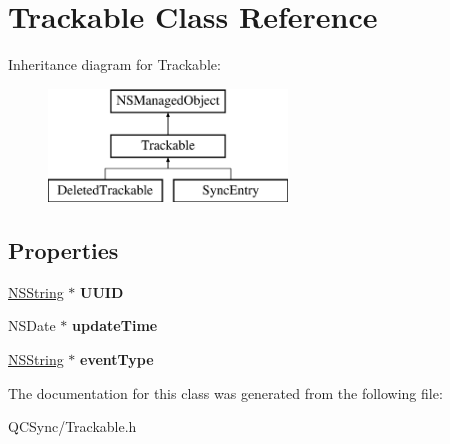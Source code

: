\hypertarget{interface_trackable}{
\section{Trackable Class Reference}
\label{interface_trackable}
}
Inheritance diagram for Trackable:\begin{figure}[H]
\begin{center}
\leavevmode
\includegraphics[height=3.000000cm]{interface_trackable}
\end{center}
\end{figure}
\subsection*{Properties}
\begin{DoxyCompactItemize}
\item 
\hypertarget{interface_trackable_a028842f8d9877c8b8011daf6a133a252}{
\hyperlink{class_n_s_string}{NSString} $\ast$ {\bfseries UUID}}
\label{interface_trackable_a028842f8d9877c8b8011daf6a133a252}

\item 
\hypertarget{interface_trackable_ae6e33e19d2af5964d713171153165bb2}{
NSDate $\ast$ {\bfseries updateTime}}
\label{interface_trackable_ae6e33e19d2af5964d713171153165bb2}

\item 
\hypertarget{interface_trackable_a8d6690b09a4e48b9bfd9e4adab7a8106}{
\hyperlink{class_n_s_string}{NSString} $\ast$ {\bfseries eventType}}
\label{interface_trackable_a8d6690b09a4e48b9bfd9e4adab7a8106}

\end{DoxyCompactItemize}


The documentation for this class was generated from the following file:\begin{DoxyCompactItemize}
\item 
QCSync/Trackable.h\end{DoxyCompactItemize}
